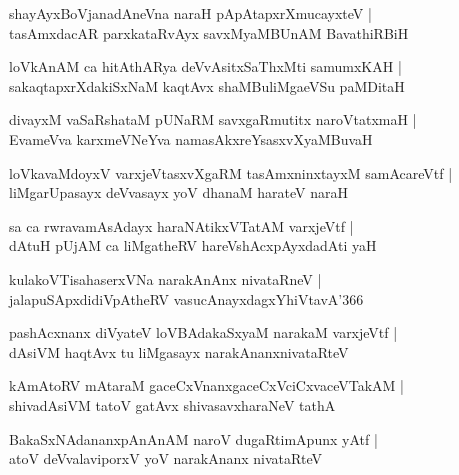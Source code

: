 \documentclass[twoside,12pt,openright]{book}
\newcounter{shloka}[chapter]
\begin{document}
\begin{shloka}%
shayAyxBoVjanadAneVna naraH pApAtapxrXmucayxteV |\\
tasAmxdacAR parxkataRvAyx savxMyaMBUnAM BavathiRBiH 
\end{shloka}

\begin{shloka}%
loVkAnAM ca hitAthARya deVvAsitxSaThxMti samumxKAH |\\
sakaqtapxrXdakiSxNaM kaqtAvx shaMBuliMgaeVSu paMDitaH 
\end{shloka}

\begin{shloka}%
divayxM vaSaRshataM pUNaRM savxgaRmutitx naroVtatxmaH |\\
EvameVva karxmeVNeYva namasAkxreYsasxvXyaMBuvaH 
\end{shloka}

\begin{shloka}%
loVkavaMdoyxV varxjeVtasxvXgaRM tasAmxninxtayxM samAcareVtf |\\
liMgarUpasayx deVvasayx yoV dhanaM harateV naraH 
\end{shloka}

\begin{shloka}%
sa ca rwravamAsAdayx haraNAtikxVTatAM varxjeVtf |\\
dAtuH pUjAM ca liMgatheRV hareVshAcxpAyxdadAti yaH 
\end{shloka}

\begin{shloka}%
kulakoVTisahaserxVNa narakAnAnx nivataRneV |\\
jalapuSApxdidiVpAtheRV vasucAnayxdagxYhiVtavA\char'366
\end{shloka}

\begin{shloka}%
pashAcxnanx diVyateV loVBAdakaSxyaM narakaM varxjeVtf |\\
dAsiVM haqtAvx tu liMgasayx narakAnanxnivataRteV 
\end{shloka}

\begin{shloka}%
kAmAtoRV mAtaraM gaceCxVnanxgaceCxVciCxvaceVTakAM |\\
shivadAsiVM tatoV gatAvx shivasavxharaNeV tathA 
\end{shloka}

\begin{shloka}%
BakaSxNAdananxpAnAnAM naroV dugaRtimApunx yAtf |\\
atoV deVvalaviporxV yoV narakAnanx nivataRteV 
\end{shloka}
\end{document}
